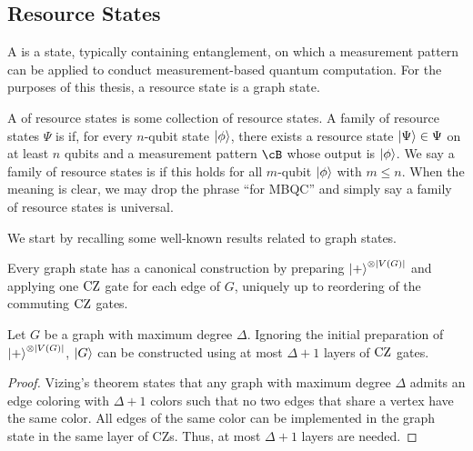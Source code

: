 \subsection{Resource States}

\begin{definition}
A  is a state, typically containing entanglement, on which a measurement pattern can be applied to conduct measurement-based quantum computation. For the purposes of this thesis, a resource state is a graph state.
\end{definition}

\begin{definition}
A  of resource states is some collection of resource states. A family of resource states $\Psi$ is  if, for every $n$-qubit state $\ket\phi$, there exists a resource state $\ket{\Psi} \in \Psi$ on at least $n$ qubits and a measurement pattern $\cB$ whose output is $\ket\phi$. We say a family of resource states is  if this holds for all $m$-qubit $\ket\phi$ with $m \leq n$. When the meaning is clear, we may drop the phrase ``for MBQC'' and simply say a family of resource states is universal.
\end{definition}

We start by recalling some well-known results related to graph states.

\begin{fact}
\label{fact:graph-state-unique-construction}
Every graph state has a canonical construction by preparing $\ket+^{\otimes |V(G)|}$
and applying one $\text{CZ}$ gate for each edge of $G$, uniquely up to reordering of the
commuting $\text{CZ}$ gates.
\end{fact}

\begin{fact}
\label{fact:graph-circuit-depth-is-max-degree}
Let $G$ be a graph with maximum degree $\Delta$. Ignoring the initial preparation of $\ket{+}^{\otimes |V(G)|}$, $\ket{G}$ can be constructed using at most $\Delta+1$ layers of $\text{CZ}$ gates.
\begin{proof}
Vizing's theorem states that any graph with maximum degree $\Delta$ admits an edge coloring with $\Delta + 1$ colors such that no two edges that share a vertex have the same color. All edges of the same color can be implemented in the graph state in the same layer of CZs. Thus, at most $\Delta + 1$ layers are needed.
\end{proof}
\end{fact}

